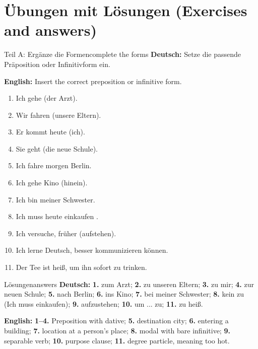 \documentclass[a4paper,11pt]{article}
\newcommand{\GermanText}[1]{\textbf{Deutsch: }#1\par}
\newcommand{\EnglishText}[1]{{\small\color{SoftGray}\textbf{English: }#1\par}}
\begin{document}
\section{Übungen mit Lösungen (Exercises and answers)}
\begin{grammarentry}{Teil A: Ergänze die Formen}{complete the forms}
\GermanText{Setze die passende Präposition oder Infinitivform ein.}
\EnglishText{Insert the correct preposition or infinitive form.}
\begin{enumerate}
\item Ich gehe \underline{\hspace{2cm}} (der Arzt).
\item Wir fahren \underline{\hspace{2cm}} (unsere Eltern).
\item Er kommt heute \underline{\hspace{2cm}} (ich).
\item Sie geht \underline{\hspace{2cm}} (die neue Schule).
\item Ich fahre morgen \underline{\hspace{2cm}} Berlin.
\item Ich gehe \underline{\hspace{2cm}} Kino (hinein).
\item Ich bin \underline{\hspace{2cm}} meiner Schwester.
\item Ich muss heute einkaufen \underline{\hspace{1cm}}.
\item Ich versuche, früher \underline{\hspace{2cm}} (aufstehen).
\item Ich lerne Deutsch, \underline{\hspace{1cm}} besser kommunizieren \underline{\hspace{1cm}} können.
\item Der Tee ist \underline{\hspace{1cm}} heiß, um ihn sofort zu trinken.
\end{enumerate}
\end{grammarentry}
\begin{grammarentry}{Lösungen}{answers}
\GermanText{\textbf{1.} zum Arzt; \textbf{2.} zu unseren Eltern; \textbf{3.} zu mir; \textbf{4.} zur neuen Schule; \textbf{5.} nach Berlin; \textbf{6.} ins Kino; \textbf{7.} bei meiner Schwester; \textbf{8.} kein zu (Ich muss einkaufen); \textbf{9.} aufzustehen; \textbf{10.} um ... zu; \textbf{11.} zu heiß.}
\EnglishText{\textbf{1--4.} Preposition with dative; \textbf{5.} destination city; \textbf{6.} entering a building; \textbf{7.} location at a person's place; \textbf{8.} modal with bare infinitive; \textbf{9.} separable verb; \textbf{10.} purpose clause; \textbf{11.} degree particle, meaning too hot.}
\end{grammarentry}
\end{document}
